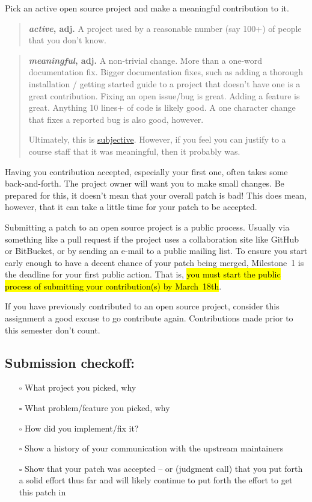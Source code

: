 \documentclass{article}
\begin{document}
Pick an active open source project and make a meaningful contribution to it.
%
\begin{quote}
  \textbf{\emph{active}, adj.} A project used by a reasonable number (say
  100+) of people that you don't know.
\end{quote}
%
\begin{quote}
  \textbf{\emph{meaningful}, adj.} A non-trivial change. More than a one-word
  documentation fix. Bigger documentation fixes, such as adding a thorough
  installation / getting started guide to a project that doesn't have one is a
  great contribution. Fixing an open issue/bug is great. Adding a feature is
  great. Anything 10 lines+ of code is likely good. A one character change
  that fixes a reported bug is also good, however.

  Ultimately, this is
  \href{https://en.wikipedia.org/wiki/I_know_it_when_I_see_it}{subjective}.
  However, if you feel you can justify to a course staff that it was
  meaningful, then it probably was.
\end{quote}
%
Having you contribution accepted, especially your first one, often takes some
back-and-forth. The project owner will want you to make small changes. Be
prepared for this, it doesn't mean that your overall patch is bad! This does
mean, however, that it can take a little time for your patch to be accepted.

\medskip
\noindent
Submitting a patch to an open source project is a public process. Usually via
something like a pull request if the project uses a collaboration site like
GitHub or BitBucket, or by sending an e-mail to a public mailing list. To
ensure you start early enough to have a decent chance of your patch being
merged, Milestone~1 is the deadline for your first public action. That is,
\hl{you must start the public process of submitting your contribution(s)
by March~18th}.

\medskip
\noindent
If you have previously contributed to an open source project, consider this
assignment a good excuse to go contribute again. Contributions made prior to
this semester don't count.

\subsection*{Submission checkoff:}
\begin{itemize}
  \item[$\square$] What project you picked, why
  \item[$\square$] What problem/feature you picked, why
  \item[$\square$] How did you implement/fix it?
  \item[$\square$] Show a history of your communication with the upstream maintainers
  \item[$\square$] Show that your patch was accepted -- or (judgment call)
    that you put forth a solid effort thus far and will likely continue to
    put forth the effort to get this patch in
\end{itemize}
\end{document}
